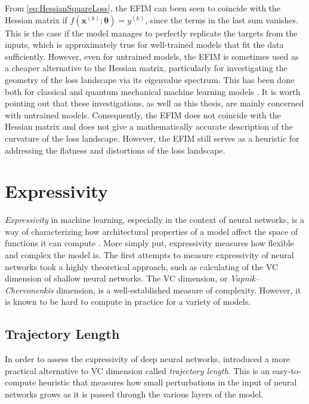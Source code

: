 From \autoref{eq:HessianSquareLoss}, the EFIM can been seen to coincide with the Hessian matrix if $f(\boldsymbol{x}^{(k)};\boldsymbol{\theta}) = y^{(k)}$, since the terms in the last sum vanishes. This is the case if the model manages to perfectly replicate the targets from the inputs, which is approximately true for well-trained models that fit the data sufficiently. However, even for untrained models, the EFIM is sometimes used as a cheaper alternative to the Hessian matrix, particularly for investigating the geometry of the loss landscape via its eigenvalue spectrum. This has been done both for classical and quantum mechanical machine learning models \cite{karakida2019universal} \cite{abbas2020power}. It is worth pointing out that these investigations, as well as this thesis, are mainly concerned with untrained models. Consequently, the EFIM does not coincide with the Hessian matrix and does not give a mathematically accurate description of the curvature of the loss landscape. However, the EFIM still serves as a heuristic for addressing the flatness and distortions of the loss landscape. 

\section{Expressivity}\label{sec:Expressivity}
\emph{Expressivity} in machine learning, especially in the context of neural networks, is a way of characterizing how architectural properties of a model affect the space of functions it can compute \citet{raghu2017expressive}. More simply put, expressivity measures how flexible and complex the model is. The first attempts to measure expressivity of neural networks took a highly theoretical approach, such as \citet{Bartlett} calculating of the VC dimension of shallow neural networks. The VC dimension, or \emph{Vapnik–Chervonenkis} dimension\cite{hastie01statisticallearning}, is a well-established measure of complexity. However, it is known to be hard to compute in practice for a variety of models\cite{abbas2020power}.  

\subsection{Trajectory Length}\label{sec:TrajectoryLength}
In order to assess the expressivity of deep neural networks, \citet{raghu2017expressive} introduced a more practical alternative to VC dimension called \emph{trajectory length}. This is an easy-to-compute heuristic that measures how small perturbations in the input of neural networks grows as it is passed through the various layers of the model. 

